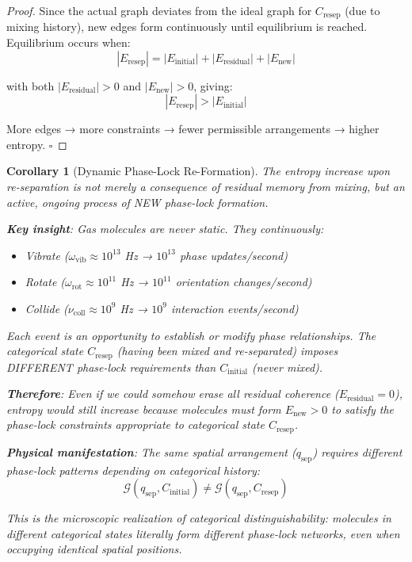 \documentclass[12pt,a4paper]{article}
\newtheorem{corollary}[theorem]{Corollary}
\theoremstyle{remark}
\begin{document}
\begin{proof}
Since the actual graph deviates from the ideal graph for $C_{\text{resep}}$ (due to mixing history), new edges form continuously until equilibrium is reached. Equilibrium occurs when:
\begin{equation}
|E_{\text{resep}}| = |E_{\text{initial}}| + |E_{\text{residual}}| + |E_{\text{new}}|
\end{equation}

with both $|E_{\text{residual}}| > 0$ and $|E_{\text{new}}| > 0$, giving:
\begin{equation}
|E_{\text{resep}}| > |E_{\text{initial}}|
\end{equation}

More edges → more constraints → fewer permissible arrangements → higher entropy. $\square$
\end{proof}

\begin{corollary}[Dynamic Phase-Lock Re-Formation]
\label{cor:dynamic_reformation}
The entropy increase upon re-separation is not merely a consequence of residual memory from mixing, but an active, ongoing process of NEW phase-lock formation.

\textbf{Key insight}: Gas molecules are never static. They continuously:
\begin{itemize}
\item Vibrate ($\omega_{\text{vib}} \approx 10^{13}$ Hz → $10^{13}$ phase updates/second)
\item Rotate ($\omega_{\text{rot}} \approx 10^{11}$ Hz → $10^{11}$ orientation changes/second)
\item Collide ($\nu_{\text{coll}} \approx 10^9$ Hz → $10^9$ interaction events/second)
\end{itemize}

Each event is an opportunity to establish or modify phase relationships. The categorical state $C_{\text{resep}}$ (having been mixed and re-separated) imposes DIFFERENT phase-lock requirements than $C_{\text{initial}}$ (never mixed).

\textbf{Therefore}: Even if we could somehow erase all residual coherence ($E_{\text{residual}} = 0$), entropy would still increase because molecules must form $E_{\text{new}} > 0$ to satisfy the phase-lock constraints appropriate to categorical state $C_{\text{resep}}$.

\textbf{Physical manifestation}: The same spatial arrangement ($q_{\text{sep}}$) requires different phase-lock patterns depending on categorical history:
\begin{equation}
\mathcal{G}(q_{\text{sep}}, C_{\text{initial}}) \neq \mathcal{G}(q_{\text{sep}}, C_{\text{resep}})
\end{equation}

This is the microscopic realization of categorical distinguishability: molecules in different categorical states literally form different phase-lock networks, even when occupying identical spatial positions.
\end{corollary}
\end{document}
